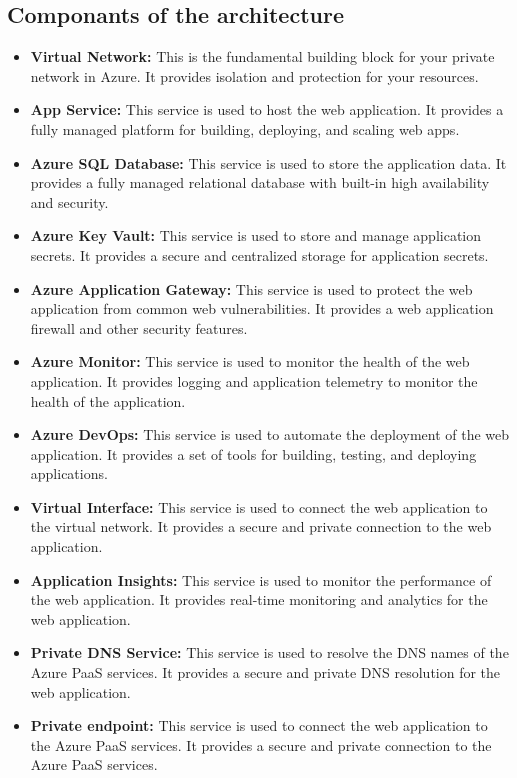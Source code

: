 \subsection*{Componants of the architecture}
\begin{itemize}
    \item \textbf{Virtual Network:} This is the fundamental building block for your private network in Azure. It provides isolation and protection for your resources.
    \item \textbf{App Service:} This service is used to host the web application. It provides a fully managed platform for building, deploying, and scaling web apps.
    \item \textbf{Azure SQL Database:} This service is used to store the application data. It provides a fully managed relational database with built-in high availability and security.
    \item \textbf{Azure Key Vault:} This service is used to store and manage application secrets. It provides a secure and centralized storage for application secrets.
    \item \textbf{Azure Application Gateway:} This service is used to protect the web application from common web vulnerabilities. It provides a web application firewall and other security features.
    \item \textbf{Azure Monitor:} This service is used to monitor the health of the web application. It provides logging and application telemetry to monitor the health of the application.
    \item \textbf{Azure DevOps:} This service is used to automate the deployment of the web application. It provides a set of tools for building, testing, and deploying applications.
    \item \textbf{Virtual Interface:} This service is used to connect the web application to the virtual network. It provides a secure and private connection to the web application.
    \item \textbf{Application Insights:} This service is used to monitor the performance of the web application. It provides real-time monitoring and analytics for the web application.
    \item \textbf{Private DNS Service:} This service is used to resolve the DNS names of the Azure PaaS services. It provides a secure and private DNS resolution for the web application.
    \item \textbf{Private endpoint:} This service is used to connect the web application to the Azure PaaS services. It provides a secure and private connection to the Azure PaaS services.
\end{itemize}

